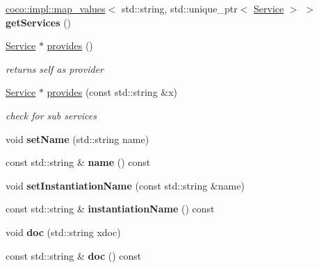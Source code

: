 \begin{DoxyCompactItemize}
\item 
\hypertarget{classcoco_1_1_service_a5dbd858b1bbf99d641b6b63bc208a8e7}{}\hyperlink{structcoco_1_1impl_1_1map__values}{coco\+::impl\+::map\+\_\+values}$<$ std\+::string, std\+::unique\+\_\+ptr$<$ \hyperlink{classcoco_1_1_service}{Service} $>$ $>$ {\bfseries get\+Services} ()\label{classcoco_1_1_service_a5dbd858b1bbf99d641b6b63bc208a8e7}

\item 
\hypertarget{classcoco_1_1_service_ad73c4cdd616d7308174c9b40bf69489c}{}\hyperlink{classcoco_1_1_service}{Service} $\ast$ \hyperlink{classcoco_1_1_service_ad73c4cdd616d7308174c9b40bf69489c}{provides} ()\label{classcoco_1_1_service_ad73c4cdd616d7308174c9b40bf69489c}

\begin{DoxyCompactList}\small\item\em returns self as provider \end{DoxyCompactList}\item 
\hypertarget{classcoco_1_1_service_ae34998ed39c71b711e9d1939472a85b1}{}\hyperlink{classcoco_1_1_service}{Service} $\ast$ \hyperlink{classcoco_1_1_service_ae34998ed39c71b711e9d1939472a85b1}{provides} (const std\+::string \&x)\label{classcoco_1_1_service_ae34998ed39c71b711e9d1939472a85b1}

\begin{DoxyCompactList}\small\item\em check for sub services \end{DoxyCompactList}\item 
\hypertarget{classcoco_1_1_service_a71e9b86365eb33d81ef7dad93e4c37da}{}void {\bfseries set\+Name} (std\+::string name)\label{classcoco_1_1_service_a71e9b86365eb33d81ef7dad93e4c37da}

\item 
\hypertarget{classcoco_1_1_service_a36b9922e26da16acc55cc239b29fb02a}{}const std\+::string \& {\bfseries name} () const \label{classcoco_1_1_service_a36b9922e26da16acc55cc239b29fb02a}

\item 
\hypertarget{classcoco_1_1_service_ab95d453640ed30f7dd6741a0d56e7495}{}void {\bfseries set\+Instantiation\+Name} (const std\+::string \&name)\label{classcoco_1_1_service_ab95d453640ed30f7dd6741a0d56e7495}

\item 
\hypertarget{classcoco_1_1_service_a2b420c54cd8f4673d5e9c9561ab8d945}{}const std\+::string \& {\bfseries instantiation\+Name} () const \label{classcoco_1_1_service_a2b420c54cd8f4673d5e9c9561ab8d945}

\item 
\hypertarget{classcoco_1_1_service_a6d2d09b40b6b37dcf0b234c11ec8147d}{}void {\bfseries doc} (std\+::string xdoc)\label{classcoco_1_1_service_a6d2d09b40b6b37dcf0b234c11ec8147d}

\item 
\hypertarget{classcoco_1_1_service_ab0c36a1d9bba3bb88cd9b7899e7db920}{}const std\+::string \& {\bfseries doc} () const \label{classcoco_1_1_service_ab0c36a1d9bba3bb88cd9b7899e7db920}

\end{DoxyCompactItemize}
